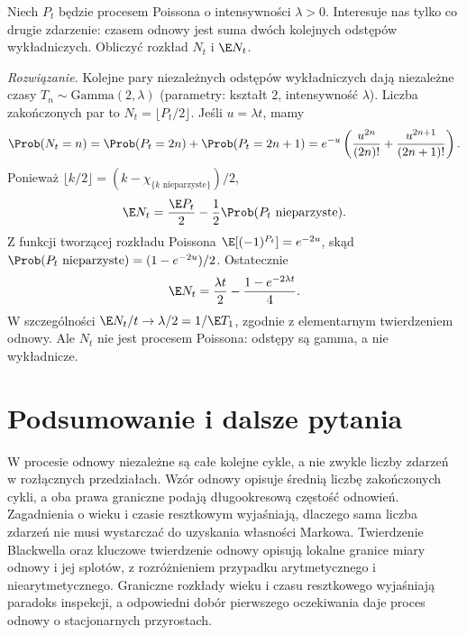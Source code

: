 \begin{zadanie}
Niech $P_t$ będzie procesem Poissona o intensywności $\lambda>0$.
Interesuje nas tylko co drugie zdarzenie: czasem odnowy jest
suma dwóch kolejnych odstępów wykładniczych. Obliczyć
rozkład $N_t$ i $\E N_t$.

\emph{Rozwiązanie.} Kolejne pary niezależnych
odstępów wykładniczych dają niezależne czasy
$T_n\sim\mathrm{Gamma}(2,\lambda)$ (parametry: kształt $2$,
intensywność $\lambda$). Liczba zakończonych par to
$N_t=\lfloor P_t/2\rfloor$. Jeśli $u=\lambda t$, mamy
\[
\Prob(N_t=n)=\Prob(P_t=2n)+\Prob(P_t=2n+1)
=e^{-u}\left(\frac{u^{2n}}{(2n)!}+
\frac{u^{2n+1}}{(2n+1)!}\right).
\]
Ponieważ $\lfloor k/2\rfloor=(k-\chi_{\{k\text{ nieparzyste}\}})/2$,
\[
\E N_t=\frac{\E P_t}{2}-\frac12\Prob(P_t\text{ nieparzyste}).
\]
Z funkcji tworzącej rozkładu Poissona
$\E[(-1)^{P_t}]=e^{-2u}$, skąd
$\Prob(P_t\text{ nieparzyste})=(1-e^{-2u})/2$.
Ostatecznie
\[
\E N_t=\frac{\lambda t}{2}-\frac{1-e^{-2\lambda t}}{4}.
\]
W szczególności $\E N_t/t\to\lambda/2=1/\E T_1$,
zgodnie z elementarnym twierdzeniem odnowy.
Ale $N_t$ nie jest procesem Poissona: odstępy są gamma,
a nie wykładnicze.
\end{zadanie}

\section{Podsumowanie i dalsze pytania}
W procesie odnowy niezależne są całe kolejne cykle, a nie
zwykle liczby zdarzeń w rozłącznych przedziałach. Wzór
odnowy opisuje średnią liczbę zakończonych cykli, a oba
prawa graniczne podają długookresową częstość odnowień.
Zagadnienia o wieku i czasie resztkowym wyjaśniają, dlaczego
sama liczba zdarzeń nie musi wystarczać do uzyskania własności Markowa.
Twierdzenie Blackwella oraz kluczowe twierdzenie
odnowy opisują lokalne granice miary odnowy
i jej splotów, z rozróżnieniem przypadku
arytmetycznego i niearytmetycznego.
Graniczne rozkłady wieku i czasu resztkowego
wyjaśniają paradoks inspekcji, a odpowiedni
dobór pierwszego oczekiwania daje proces
odnowy o stacjonarnych przyrostach.


